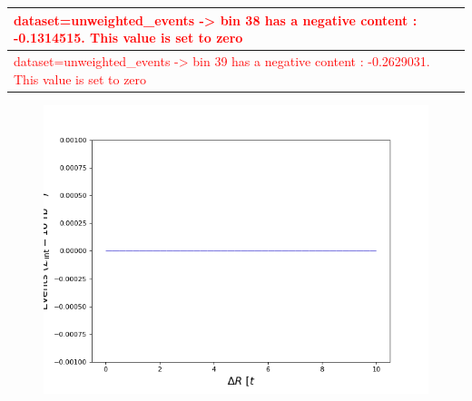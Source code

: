 \documentclass[a4paper, 10pt]{article}
\begin{document}
\begin{table}[H]
\begin{center}
\begin{tabular}{|m{140.0mm}|}
      \hline
      {\cellcolor{white}\textcolor{red}{dataset=unweighted\_events -> bin 38 has a negative content : -0.1314515. This value is set to zero}}\\
      \hline
      {\cellcolor{white}\textcolor{red}{dataset=unweighted\_events -> bin 39 has a negative content : -0.2629031. This value is set to zero}}\\
      \hline
\hline
    \end{tabular}
  \end{center}
\end{table}

\begin{figure}[H]
  \begin{center}
    \includegraphics[scale=0.45]{selection_8.png}\\
\caption{   }
  \end{center}
\end{figure}
      
\end{document}
